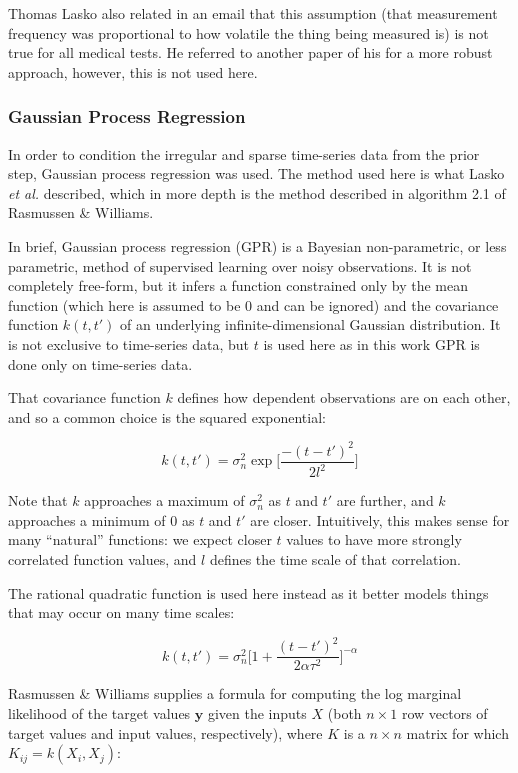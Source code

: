 \documentclass[journal]{IEEEtran}
\begin{document}
Thomas Lasko also related in an email that this assumption (that
measurement frequency was proportional to how volatile the thing being
measured is) is not true for all medical tests.  He referred to
another paper of his\cite{Lasko2015} for a more robust approach,
however, this is not used here.

\subsubsection{Gaussian Process Regression}

In order to condition the irregular and sparse time-series data from
the prior step, Gaussian process regression was used.  The method used
here is what Lasko \emph{et al.}\cite{Lasko2013} described, which in
more depth is the method described in algorithm 2.1 of Rasmussen \&
Williams\cite{Rasmussen2004}.

In brief, Gaussian process regression (GPR) is a Bayesian
non-parametric, or less parametric, method of supervised learning over
noisy observations\cite{Ebden2015,Lasko2013,Rasmussen2004}.  It is not
completely free-form, but it infers a function constrained only by the
mean function (which here is assumed to be 0 and can be ignored) and
the covariance function $k(t,t')$ of an underlying
infinite-dimensional Gaussian distribution.  It is not exclusive to
time-series data, but $t$ is used here as in this work GPR is done
only on time-series data.

That covariance function $k$ defines how dependent observations are on
each other, and so a common choice is the squared
exponential\cite{Ebden2015}:

$$k(t,t') = \sigma_n^2\exp\bigg[\frac{-(t-t')^2}{2l^2}\bigg]$$

Note that $k$ approaches a maximum of $\sigma_n^2$ as $t$ and $t'$ are
further, and $k$ approaches a minimum of 0 as $t$ and $t'$ are closer.
Intuitively, this makes sense for many ``natural'' functions: we
expect closer $t$ values to have more strongly correlated function
values, and $l$ defines the time scale of that correlation.

The rational quadratic function is used here instead as it better
models things that may occur on many time scales\cite{Lasko2013}:

$$k(t,t') = \sigma_n^2\bigg[1+\frac{(t-t')^2}{2\alpha\tau^2}\bigg]^{-\alpha}$$

Rasmussen \& Williams\cite{Rasmussen2004} supplies a formula for
computing the log marginal likelihood of the target values
$\mathbf{y}$ given the inputs $X$ (both $n\times1$ row vectors of
target values and input values, respectively), where $K$ is a $n\times
n$ matrix for which $K_{ij}=k(X_i,X_j)$:
\end{document}
